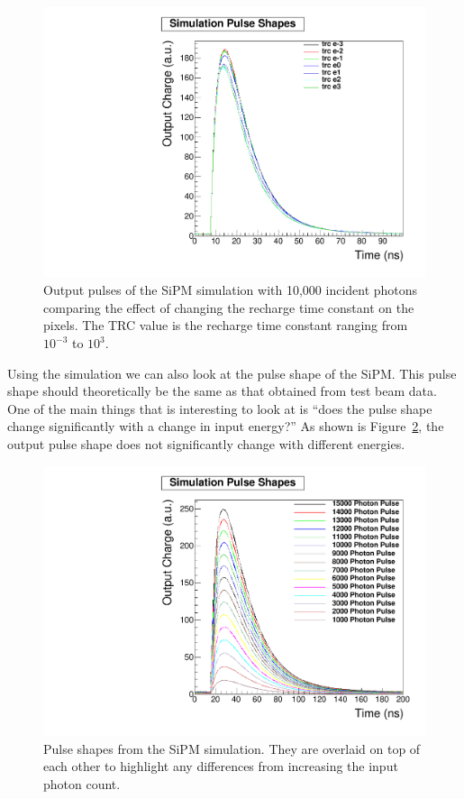 \begin{figure}
\centering
\includegraphics[width=0.8\linewidth]{Figures/trc.pdf}
\caption{Output pulses of the SiPM simulation with 10,000 incident photons comparing the effect of changing the recharge time constant on the pixels. The TRC value is the recharge time constant ranging from $10^{-3}$ to $10^3$.}
\label{fig:trc}
\end{figure}

Using the simulation we can also look at the pulse shape of the SiPM. This pulse shape should theoretically be the same as that obtained from test beam data. One of the main things that is interesting to look at is ``does the pulse shape change significantly with a change in input energy?'' As shown is Figure~\ref{fig:SimPul}, the output pulse shape does not significantly change with different energies.

\begin{figure}
\centering
\includegraphics[width=0.8\linewidth]{Figures/SimPul.pdf}
\caption{Pulse shapes from the SiPM simulation. They are overlaid on top of each other to highlight any differences from increasing the input photon count.}
\label{fig:SimPul}
\end{figure}

